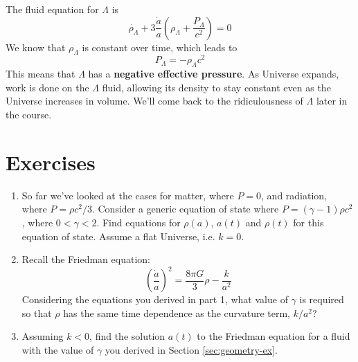 \documentclass[11pt,a4paper]{book}
\begin{document}
The fluid equation for \(\Lambda\) is
\begin{equation}
\dot{\rho_{\Lambda}} + 3\frac{\dot{a}}{a} \left(\rho_{\Lambda} + \dfrac{P_{\Lambda}}{c^2}\right) = 0
\label{eq:rho-lambda-1}
\end{equation}
We know that \(\rho_{\Lambda}\) is constant over time, which leads to
\begin{equation}
P_\Lambda = -\rho_{\Lambda}c^2
\label{eq:rho-lambda-2}
\end{equation}
This means that \(\Lambda\) has a
\textbf{negative effective pressure}. As Universe expands, work is done on
the \(\Lambda\) fluid, allowing its density to stay constant even as the
Universe increases in volume. We'll come back to the ridiculousness of
\(\Lambda\) later in the course.

\hypertarget{sec:composition_ex}{%
\section{Exercises}\label{sec:composition_ex}}

\begin{enumerate}
\def\labelenumi{\arabic{enumi}.}
\item
  So far we've looked at the cases for matter, where \(P = 0\), and
  radiation, where \(P = \rho c^2 / 3\). Consider a generic equation of
  state where \(P = (\gamma - 1) \rho c^2\), where \(0 < \gamma < 2\).
  Find equations for \(\rho(a)\), \(a(t)\) and \(\rho(t)\) for this equation
  of state. Assume a flat Universe, i.e. \(k=0\).
\item
  Recall the Friedman equation:
  \[\left(\dfrac{\dot{a}}{a}\right)^2 = \dfrac{8\pi G}{3}\rho - \dfrac{k}{a^2}\]
  Considering the equations you derived in part 1, what value of
  \(\gamma\) is required so that \(\rho\) has the same time dependence as
  the curvature term, \(k/a^2\)?
\item
  Assuming \(k<0\), find the solution \(a(t)\) to the Friedman equation
  for a fluid with the value of \(\gamma\) you derived in Section \ref{sec:geometry-ex}.
\end{enumerate}


\end{document}
